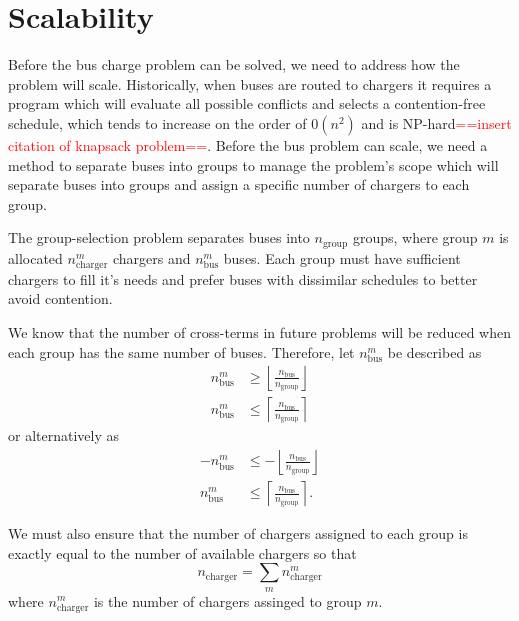 \section{Scalability}
Before the bus charge problem can be solved, we need to address how the problem will scale. Historically, when buses are routed to chargers it requires a program which will evaluate all possible conflicts and selects a contention-free schedule, which tends to increase on the order of $0(n^2)$ and is NP-hard\textcolor{red}{==insert citation of knapsack problem==}. Before the bus problem can scale, we need a method to separate buses into groups to manage the problem's scope which will separate buses into groups and assign a specific number of chargers to each group.
\par The group-selection problem separates buses into $n_{\text{group}}$ groups, where group $m$ is allocated $n^m_{\text{charger}}$ chargers and $n^m_{\text{bus}}$ buses. Each group must have sufficient chargers to fill it's needs and prefer buses with dissimilar schedules to better avoid contention. 
\par We know that the number of cross-terms in future problems will be reduced when each group has the same number of buses. Therefore, let $n^m_{\text{bus}}$ be described as
\begin{equation*}\begin{aligned}
	n^m_{\text{bus}} &\ge \left \lfloor \frac{n_{\text{bus}}}{n_{\text{group}}} \right \rfloor \\
	n^m_{\text{bus}} &\le \left \lceil \frac{n_{\text{bus}}}{n_{\text{group}}} \right \rceil
\end{aligned}\end{equation*}
or alternatively as 
\begin{equation}\begin{aligned}
	-n^m_{\text{bus}} &\le -\left \lfloor \frac{n_{\text{bus}}}{n_{\text{group}}} \right \rfloor \\
	n^m_{\text{bus}} &\le \left \lceil \frac{n_{\text{bus}}}{n_{\text{group}}} \right \rceil.
\end{aligned}\end{equation}
\par We must also ensure that the number of chargers assigned to each group is exactly equal to the number of available chargers so that
\begin{equation}
	n_{\text{charger}} = \sum_mn_{\text{charger}}^m
\end{equation}
where $n_{\text{charger}}^m$ is the number of chargers assinged to group $m$.
